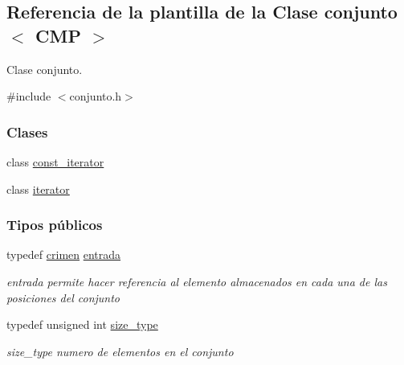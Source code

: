 \hypertarget{classconjunto}{\subsection{Referencia de la plantilla de la Clase conjunto$<$ C\-M\-P $>$}
\label{classconjunto}
}


Clase conjunto.  




{\ttfamily \#include $<$conjunto.\-h$>$}

\subsubsection*{Clases}
\begin{DoxyCompactItemize}
\item 
class \hyperlink{classconjunto_1_1const__iterator}{const\-\_\-iterator}
\item 
class \hyperlink{classconjunto_1_1iterator}{iterator}
\end{DoxyCompactItemize}
\subsubsection*{Tipos públicos}
\begin{DoxyCompactItemize}
\item 
typedef \hyperlink{classcrimen}{crimen} \hyperlink{classconjunto_a7630ace7cb17bcec07daf5804f1a0780}{entrada}
\begin{DoxyCompactList}\small\item\em entrada permite hacer referencia al elemento almacenados en cada una de las posiciones del conjunto \end{DoxyCompactList}\item 
typedef unsigned int \hyperlink{classconjunto_a0cc9902da62790ec2a6d59f4559c2df5}{size\-\_\-type}
\begin{DoxyCompactList}\small\item\em size\-\_\-type numero de elementos en el conjunto \end{DoxyCompactList}\end{DoxyCompactItemize}
